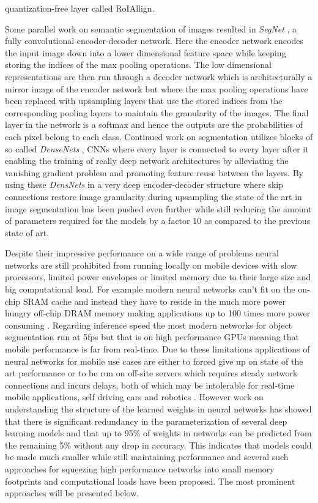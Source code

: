 \documentclass[11pt]{article}
\newcommand{\bibentry}[1]{\cite{#1}}
\begin{document}
quantization-free layer called RoIAllign.

Some parallel work on semantic segmentation of images resulted in \emph{SegNet} \bibentry{badrinarayanan2015segnet}, a fully convolutional encoder-decoder network. Here the encoder network encodes the input image down into a lower dimensional feature space while keeping storing the indices of the max pooling operations. The low dimensional representations are then run through a decoder network which is architecturally a mirror image of the encoder network but where the max pooling operations have been replaced with upsampling layers that use the stored indices from the corresponding pooling layers to maintain the granularity of the images. The final layer in the network is a softmax and hence the outputs are the probabilities of each pixel belong to each class.
Continued work on segmentation utilizes blocks of so called \emph{DenseNets} \bibentry{huang2017densely}, CNNs where every layer is connected to every layer after it enabling the training of really deep network architectures by alleviating the vanishing gradient problem and promoting feature reuse between the layers. By using these \emph{DensNets} in a very deep encoder-decoder structure where skip connections restore image granularity during upsampling the state of the art in image segmentation has been pushed even further \bibentry{jegou2017one} while still reducing the amount of parameters required for the models by a factor 10 as compared to the previous state of art.

Despite their impressive performance on a wide range of problems neural networks are still prohibited from running locally on mobile devices with slow processors, limited power envelopes or limited memory due to their large size and big computational load. For example modern neural networks can't fit on the on-chip SRAM cache and instead they have to reside in the much more power hungry off-chip DRAM memory making applications up to 100 times more power consuming \bibentry{han2015learning}. Regarding inference speed the most modern networks for object segmentation \bibentry{he2017mask} run at 5fps but that is on high performance GPUs meaning that mobile performance is far from real-time. Due to these limitations applications of neural networks for mobile use cases are either to forced give up on state of the art performance or to be run on off-site servers which requires steady network connections and incurs delays, both of which may be intolerable for real-time mobile applications, self driving cars and robotics \bibentry{jin2014flattened}. However work on understanding the structure of the learned weights in neural networks \bibentry{denil2013predicting} has showed that there is significant redundancy in the parameterization of several deep learning models and that up to 95\% of weights in networks can be predicted from the remaining 5\% without any drop in accuracy. This indicates that models could be made much smaller while still maintaining performance and several such approaches for squeezing high performance networks into small memory footprints and computational loads have been proposed. The most prominent approaches will be presented below. 
\end{document}

